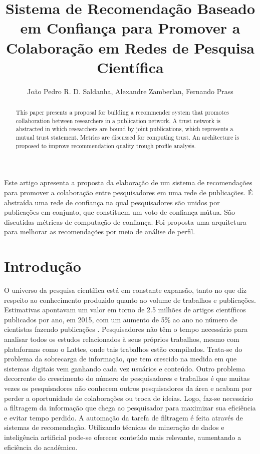 \documentclass[12pt]{article}
\title{Sistema de Recomendação Baseado em Confiança para Promover a Colaboração em Redes de Pesquisa Científica}
\author{João Pedro R. D. Saldanha\inst{1}, Alexandre Zamberlan\inst{1}, Fernando Prass\inst{1}}
\begin{document}
 

\maketitle

\begin{abstract}
  This paper presents a proposal for building a recommender system that promotes collaboration between researchers in a publication network. A trust network is abstracted in which researchers are bound by joint publications, which represents a mutual trust statement. Metrics are discussed for  computing trust. An architecture is proposed to improve recommendation quality trough profile analysis.
\end{abstract}

\begin{resumo} 
  Este artigo apresenta a proposta da elaboração de um sistema de recomendações para promover a colaboração entre pesquisadores em uma rede de publicações. É abstraída uma rede de confiança na qual pesquisadores são unidos por publicações em conjunto, que constituem um voto de confiança mútua. São discutidas métricas de computação de confiança. Foi proposta uma arquitetura para melhorar as recomendações por meio de análise de perfil.
\end{resumo}

\section{Introdução}

O universo da pesquisa científica está em constante expansão, tanto no que diz respeito ao conhecimento produzido quanto ao volume de trabalhos e publicações. Estimativas apontavam um valor em torno de 2.5 milhões de artigos científicos publicados por ano, em 2015, com um aumento de 5\% ao ano no número de cientistas fazendo publicações \cite{ware2015stm}. Pesquisadores não têm o tempo necessário para analisar todos os estudos relacionados à seus próprios trabalhos, mesmo com plataformas como o Lattes, onde tais trabalhos estão compilados. Trata-se do problema da sobrecarga de informação, que tem crescido na medida em que sistemas digitais vem ganhando cada vez usuários e conteúdo. Outro problema decorrente do crescimento do número de pesquisadores e trabalhos é que muitas vezes os pesquisadores não conhecem outros pesquisadores da área e acabam por perder a oportunidade de colaborações ou troca de ideias. Logo, faz-se necessário a filtragem da informação que chega ao pesquisador para maximizar sua eficiência e evitar tempo perdido. A automação da tarefa de filtragem é feita através de sistemas de recomendação. Utilizando técnicas de mineração de dados e inteligência artificial pode-se oferecer conteúdo mais relevante, aumentando a eficiência do acadêmico. 
\end{document}
